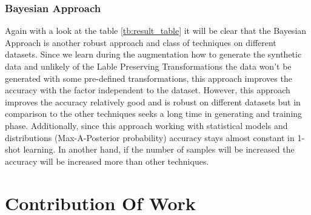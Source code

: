\subsection{Bayesian Approach}
Again with a look at the table \ref{tb:result_table}  it will be clear that the Bayesian Approach is
another robust approach and class of techniques on different datasets. Since we learn during the
augmentation how to generate the synthetic data and unlikely of the Lable Preserving Transformations
the data won't be generated with some pre-defined transformations, this approach improves the
accuracy with the factor independent to the dataset. However, this approach improves the accuracy relatively good and is robust on different datasets but in comparison to the other techniques seeks a long time in generating and training phase. Additionally, since this approach working with statistical models and distributions (Max-A-Posterior probability) accuracy stays almost constant in 1-shot learning. In another hand, if the number of samples will be increased the accuracy will be increased more than other techniques.

\chapter{Contribution Of Work}